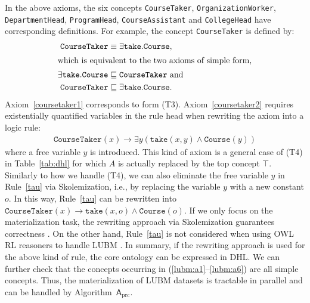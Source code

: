 In the above axioms, the six concepts \texttt{CourseTaker}, \texttt{OrganizationWorker},
\texttt{DepartmentHead}, \texttt{ProgramHead}, \texttt{CourseAssistant}
and \texttt{CollegeHead} have corresponding definitions.
For example, the concept \texttt{CourseTaker} is defined by:
\begin{align}
  \texttt{CourseTaker} & \equiv\exists\texttt{take}.\texttt{Course},\notag\\
  \intertext{which is equivalent to the two axioms of simple form,}
  \exists\texttt{take}.\texttt{Course} &
                                         \sqsubseteq\texttt{CourseTaker} \mbox{ and}\label{coursetaker1}\\
  \texttt{CourseTaker} &
                         \sqsubseteq\exists\texttt{take}.\texttt{Course}.\label{coursetaker2}
\end{align}
Axiom~\eqref{coursetaker1} corresponds to form
(T3). Axiom~\eqref{coursetaker2} requires existentially quantified
variables in the rule head when rewriting the axiom into a logic rule:
\begin{align}
\texttt{CourseTaker}(x)\rightarrow\exists y(\texttt{take}(x,y)\wedge
  \texttt{Course}(y))\label{tau}\tag{$\tau$}
\end{align}
where a free variable $y$ is introduced. This kind of axiom is a general case of (T4) in Table~\ref{tab:dhl}
for which $A$ is actually replaced by the top concept $\top$.
Similarly to how we handle (T4), we can also eliminate the free variable $y$
in Rule~\eqref{tau} via Skolemization, i.e., by replacing the variable $y$ with a new constant $o$.
In this way, Rule~\eqref{tau} can be rewritten into $\texttt{CourseTaker}(x)\rightarrow\texttt{take}(x,o)\wedge \texttt{Course}(o)$.
If we only focus on the materialization task, the rewriting approach via Skolemization guarantees
correctness \cite{GrauHKKMMW13}.
On the other hand, Rule~\eqref{tau} is not considered when using OWL RL reasoners to handle LUBM \cite{UrbaniKMHB12,WeaverH09}.
In summary, if the rewriting approach is used for the above kind of rule,
the core ontology can be expressed in DHL.
We can further check that the concepts occurring in (\ref{lubm:a1}--\ref{lubm:a6})
are all simple concepts. Thus,
the materialization of LUBM datasets is tractable in parallel and can be handled by
Algorithm~$\mathsf{A}_{\text{prc}}$.


